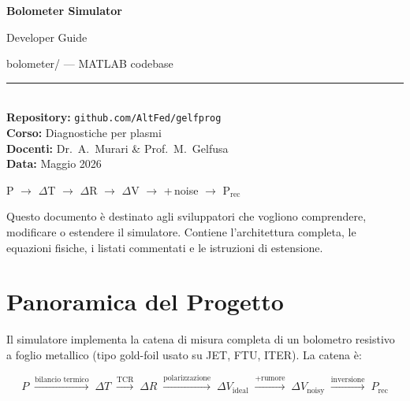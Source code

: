 \documentclass[11pt,a4paper]{article}
\begin{document}
\begin{titlepage}
  \centering
  \vspace*{2cm}
  {\Huge\bfseries\color{titleblue} Bolometer Simulator\\[0.4em]}
  {\LARGE Developer Guide\par}
  \vspace{1.5cm}
  {\large\ttfamily bolometer/ --- MATLAB codebase\par}
  \vspace{0.8cm}
  \rule{12cm}{0.4pt}\\[0.6cm]
  {\large
    \textbf{Repository:} \texttt{github.com/AltFed/gelfprog}\\[0.3em]
    \textbf{Corso:} Diagnostiche per plasmi\\[0.3em]
    \textbf{Docenti:} Dr.~A.~Murari \& Prof.~M.~Gelfusa\\[0.3em]
    \textbf{Data:} Maggio 2026
  }
  \vspace{1.5cm}

  \begin{mdframed}[backgroundcolor=codebg,linecolor=rulecolor]
  \centering\ttfamily\large
  \textcolor{matlabblue}{P} $\to$
  \textcolor{matlabgreen}{$\Delta$T} $\to$
  \textcolor{matlabgreen}{$\Delta$R} $\to$
  \textcolor{matlabgreen}{$\Delta$V} $\to$
  \textcolor{matlabstring}{+\,noise} $\to$
  \textcolor{matlabblue}{P$_\text{rec}$}
  \end{mdframed}
  \vfill
  {\small\color{matlabgray}
    Questo documento è destinato agli sviluppatori che vogliono comprendere,
    modificare o estendere il simulatore. Contiene l'architettura completa,
    le equazioni fisiche, i listati commentati e le istruzioni di estensione.}
\end{titlepage}

\tableofcontents
\newpage

\section{Panoramica del Progetto}

Il simulatore implementa la catena di misura completa di un bolometro resistivo
a foglio metallico (tipo gold-foil usato su JET, FTU, ITER). La catena è:

\begin{equation}
  P \;\xrightarrow{\text{bilancio termico}}\;
  \Delta T \;\xrightarrow{\text{TCR}}\;
  \Delta R \;\xrightarrow{\text{polarizzazione}}\;
  \Delta V_{\text{ideal}}
  \;\xrightarrow{\text{+rumore}}\;
  \Delta V_{\text{noisy}}
  \;\xrightarrow{\text{inversione}}\;
  P_{\text{rec}}
\end{equation}
\end{document}
